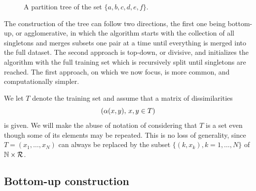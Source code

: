 \begin{figure}
\centering
{}
\caption{\label{fig:dendogram}
A partition tree of the set $\{a,b,c,d,e,f\}$.}
\end{figure}

The construction of the tree can follow two directions, the first one being bottom-up, or agglomerative, in which the algorithm starts with the collection of all singletons and merges subsets one pair at a time until everything is merged into the full dataset. The second approach is top-down, or divisive, and initializes the algorithm with the full training set which is recursively split until singletons are reached. The first approach, on which we now focus, is more common, and computationally simpler. 

We let $T$ denote the training set and assume that a matrix of  dissimilarities 
\[
(\alpha(x,y),\, x,y\in T)
\]
 is given. We will make the abuse of notation of considering that $T$ is a set even though some of its elements may be repeated. This is no loss of generality, since $T = (x_1, \ldots, x_N)$ can always be replaced by the subset $\{ (k,x_k), k=1, \ldots, N\}$ of ${\mathbb{N}} \times {\mathcal R}$.

\subsection{Bottom-up construction}

